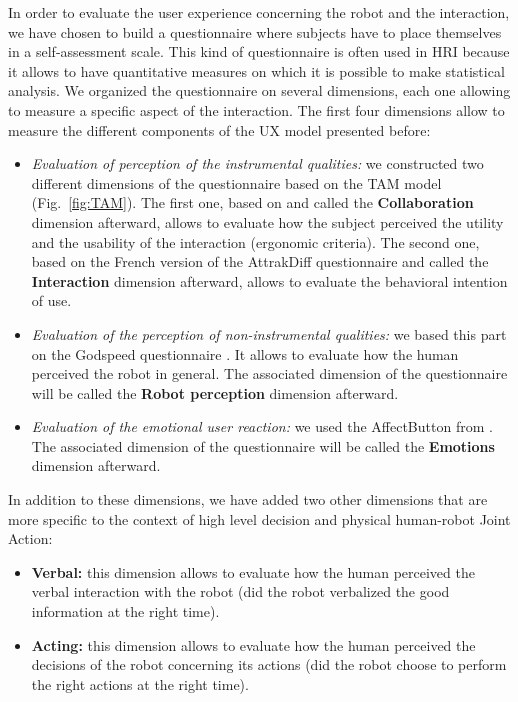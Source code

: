 \documentclass[english,a4paper,11pt,twoside]{StyleThese}
\begin{document}
In order to evaluate the user experience concerning the robot and the interaction, we have chosen to build a questionnaire where subjects have to place themselves in a self-assessment scale. This kind of questionnaire is often used in HRI because it allows to have quantitative measures on which it is possible to make statistical analysis. We organized the questionnaire on several dimensions, each one allowing to measure a specific aspect of the interaction. The first four dimensions allow to measure the different components of the UX model presented before:
\begin{itemize}
\item \textit{Evaluation of perception of the instrumental qualities:} we constructed two different dimensions of the questionnaire based on the TAM model (Fig.~\ref{fig:TAM}). The first one, based on \cite{weistroffer2014etude} and called the \textbf{Collaboration} dimension afterward, allows to evaluate how the subject perceived the utility and the usability of the interaction (ergonomic criteria). The second one, based on the French version of the AttrakDiff questionnaire \cite{lallemand2015creation} and called the \textbf{Interaction} dimension afterward, allows to evaluate the behavioral intention of use.
\item \textit{Evaluation of the perception of non-instrumental qualities:} we based this part on the Godspeed questionnaire \cite{bartneck2009measurement}. It allows to  evaluate how the human perceived the robot in general. The associated dimension of the questionnaire will be called the \textbf{Robot perception} dimension afterward.
\item \textit{Evaluation of the emotional user reaction:} we used the AffectButton from \cite{broekens2013affectbutton}. The associated dimension of the questionnaire will be called the \textbf{Emotions} dimension afterward.
\end{itemize}

In addition to these dimensions, we have added two other dimensions that are more specific to the context of high level decision and physical human-robot Joint Action:
\begin{itemize}
\item \textbf{Verbal:} this dimension allows to evaluate how the human perceived the verbal interaction with the robot (did the robot verbalized the good information at the right time).
\item \textbf{Acting:} this dimension allows to evaluate how the human perceived the decisions of the robot concerning its actions (did the robot choose to perform the right actions at the right time).
\end{itemize}
\end{document}
